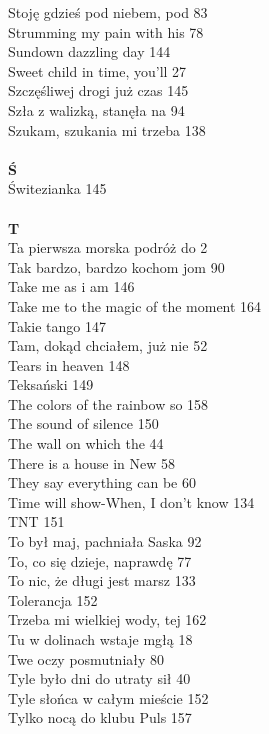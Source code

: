 \documentclass[a5paper, 10pt]{book}
\begin{document}
{\begin{multicols}{3}
    Stoję gdzieś pod niebem, pod 83\\
    Strumming my pain with his 78\\
    Sundown dazzling day 144\\
    Sweet child in time, you'll 27\\
    Szczęśliwej drogi już czas 145\\
    Szła z walizką, stanęła na 94\\
    Szukam, szukania mi trzeba 138\\
    \\
    {\footnotesize \textbf{Ś\\} }
    Świtezianka 145\\
    \\
    {\footnotesize \textbf{T\\} }
    Ta pierwsza morska podróż do 2\\
    Tak bardzo, bardzo kochom jom 90\\
    Take me as i am 146\\
    Take me to the magic of the moment 164\\
    Takie tango 147\\
    Tam, dokąd chciałem, już nie 52\\
    Tears in heaven 148\\
    Teksański 149\\
    The colors of the rainbow so 158\\
    The sound of silence 150\\
    The wall on which the 44\\
    There is a house in New 58\\
    They say everything can be 60\\
    Time will show-When, I don't know 134\\
    TNT 151\\
    To był maj, pachniała Saska 92\\
    To, co się dzieje, naprawdę 77\\
    To nic, że długi jest marsz 133\\
    Tolerancja 152\\
    Trzeba mi wielkiej wody, tej 162\\
    Tu w dolinach wstaje mgłą 18\\
    Twe oczy posmutniały 80\\
    Tyle było dni do utraty sił 40\\
    Tyle słońca w całym mieście 152\\
    Tylko nocą do klubu Puls 157\\

\end{multicols}}
\end{document}
